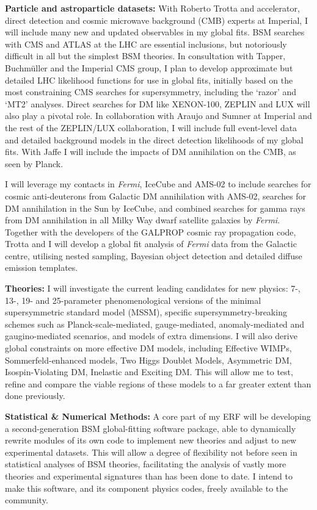 \documentclass[11pt,oneside,twocolumn,a4paper]{article}
\begin{document}
\textbf{Particle and astroparticle datasets:}
With Roberto Trotta and accelerator, direct detection and cosmic microwave background (CMB) experts at Imperial, I will include many new and updated observables in my global fits.  BSM searches with CMS and ATLAS at the LHC are essential inclusions, but notoriously difficult in all but the simplest BSM theories.  In consultation with Tapper, Buchm\"uller and the Imperial CMS group, I plan to develop approximate but detailed LHC likelihood functions for use in global fits, initially based on the most constraining CMS searches for supersymmetry, including the `razor' and `MT2' analyses.  Direct searches for DM like XENON-100, ZEPLIN and LUX will also play a pivotal role.  In collaboration with Araujo and Sumner at Imperial and the rest of the ZEPLIN/LUX collaboration, I will include full event-level data and detailed background models in the direct detection likelihoods of my global fits.  With Jaffe I will include the impacts of DM annihilation on the CMB, as seen by Planck.

I will leverage my contacts in \textit{Fermi}, IceCube and AMS-02 to include searches for cosmic anti-deuterons from Galactic DM annihilation with AMS-02, searches for DM annihilation in the Sun by IceCube, and combined searches for gamma rays from DM annihilation in all Milky Way dwarf satellite galaxies by \textit{Fermi}.   Together with the developers of the \textsf{GALPROP} cosmic ray propagation code, Trotta and I will develop a global fit analysis of \textit{Fermi} data from the Galactic centre, utilising nested sampling, Bayesian object detection and detailed diffuse emission templates.

\textbf{Theories:}
I will investigate the current leading candidates for new physics: 7-, 13-, 19- and 25-parameter phenomenological versions of the minimal supersymmetric standard model (MSSM), specific supersymmetry-breaking schemes such as Planck-scale-mediated, gauge-mediated, anomaly-mediated and gaugino-mediated scenarios, and models of extra dimensions.  I will also derive global constraints on more effective DM models, including Effective WIMPs, Sommerfeld-enhanced models, Two Higgs Doublet Models, Asymmetric DM, Isospin-Violating DM, Inelastic and Exciting DM.  This will allow me to test, refine and compare the viable regions of these models to a far greater extent than done previously.

\textbf{Statistical \& Numerical Methods:}
A core part of my ERF will be developing a second-generation BSM global-fitting software package, able to dynamically rewrite modules of its own code to implement new theories and adjust to new experimental datasets.  This will allow a degree of flexibility not before seen in statistical analyses of BSM theories, facilitating the analysis of vastly more theories and experimental signatures than has been done to date.  I intend to make this software, and its component physics codes, freely available to the community.
\end{document}
